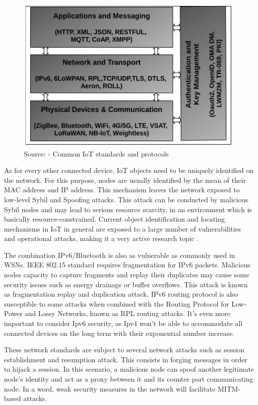 \begin{figure}[htbp]
	\centerline{\includegraphics[scale=0.60]{figures/iot/iot_standards_protocols.png}}
	\caption{Source: \cite{khan_iot_2018} - Common IoT standards and protocols}
	\label{fig}
\end{figure}

As for every other connected device, IoT objects need to be uniquely identified on the network. For this purpose, nodes are usually identified by the mean of their MAC address and IP address. This mechanism leaves the network exposed to low-level Sybil and Spoofing attacks. This attack can be conducted by malicious Sybil nodes and may lead to serious resource scarcity, in an environment which is basically resource-constrained. Current object identification and locating mechanisms in IoT in general are exposed to a large number of vulnerabilities and operational attacks, making it a very active research topic \cite{zhang_iot_2014}.

The combination IPv6/Bluetooth is also as vulnerable as commonly used in WSNs. IEEE 802.15 standard requires fragmentation for IPv6 packets. Malicious nodes capacity to capture fragments and replay their duplicates may cause some security issues such as energy drainage or buffer overflows. This attack is known as fragmentation replay and duplication attack. IPv6 routing protocol  is also susceptible to some attacks when combined with the Routing Protocol for Low-Power and Lossy Networks, known as RPL routing attacks. It’s even more important to consider Ipv6 security, as Ipv4 won’t be able to accommodate all connected devices on the long term with their exponential number increase.

These network standards are subject to several network attacks such as session establishment and resumption attack. This consists in forging messages in order to hijack a session. In this scenario, a malicious node can spoof another legitimate node’s identity and act as a proxy between it and its counter part communicating node. In a word, weak security measures in the network will facilitate MITM-based attacks.

